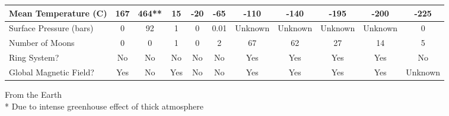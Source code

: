 \documentclass[12pt]{article}
\begin{document}
\begin{center}
{\begin{tabular}{|p{2.5cm}|*{10}{c|}}
    Mean Temperature (C) &  167 &  464** &  15 &  -20 &  -65 &  -110 &  -140 &  -195 &  -200 &  -225 \\ \hline
    Surface Pressure (bars) &  0 &  92 &  1 &  0 &  0.01 &  Unknown &  Unknown &  Unknown &  Unknown &  0 \\ \hline
    Number of Moons &  0 &  0 &  1 &  0 &  2 &  67 &  62 &  27 &  14 &  5 \\ \hline
    Ring System? &  No &  No &  No &  No &  No &  Yes &  Yes &  Yes &  Yes &  No \\ \hline
    Global Magnetic Field? &  Yes &  No &  Yes &  No &  No &  Yes &  Yes &  Yes &  Yes &  Unknown \\ \hline
    \end{tabular}
}
\end{center}
{\footnotesize * From the Earth}\\
{\footnotesize ** Due to intense greenhouse effect of thick atmosphere}\\
\end{document}
